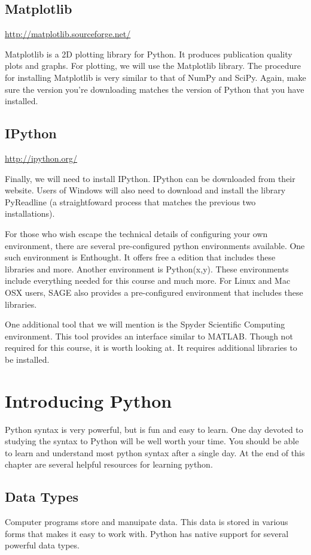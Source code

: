 \subsection*{Matplotlib}
\url{http://matplotlib.sourceforge.net/}

Matplotlib is a 2D plotting library for Python.  It produces publication quality plots and graphs.
For plotting, we will use the Matplotlib library.  The procedure for installing Matplotlib is very similar to that of NumPy and SciPy.  Again, make sure the version you're downloading matches the version of Python that you have installed.

\subsection*{IPython}
\url{http://ipython.org/}

Finally, we will need to install IPython.  IPython can be downloaded from their website.  Users of Windows will also need to download and install the library PyReadline (a straightfoward process that matches the previous two installations).

For those who wish escape the technical details of configuring your own environment, there are several pre-configured python environments available.  One such environment is Enthought.  It offers free a edition that includes these libraries and more.  Another environment is Python(x,y).  These environments include everything needed for this course and much more.  For Linux and Mac OSX users, SAGE also provides a pre-configured environment that includes these libraries.

One additional tool that we will mention is the Spyder Scientific Computing environment.  This tool provides an interface similar to MATLAB.  Though not required for this course, it is worth looking at.  It requires additional libraries to be installed.

\section*{Introducing Python}
Python syntax is very powerful, but is fun and easy to learn.  One day devoted to studying the syntax to Python will be well worth your time.  You should be able to learn and understand most python syntax after a single day.  At the end of this chapter are several helpful resources for learning python.

\subsection*{Data Types}
Computer programs store and manuipate data.  This data is stored in various forms that makes it easy to work with.  Python has native support for several powerful data types.

